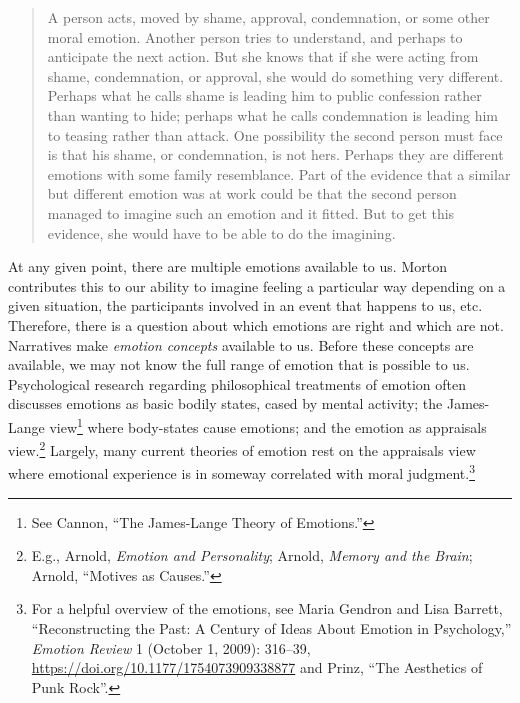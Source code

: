\documentclass[phdthesis,12pt,final,a4paper]{wuthesis}
\theoremstyle{definition}
\theoremstyle{definition}
\theoremstyle{definition}
\theoremstyle{definition}
\theoremstyle{remark}
\begin{document}
\begin{quote}
A person acts, moved by shame, approval, condemnation, or some other moral emotion. Another person tries to understand, and perhaps to anticipate the next action. But she knows that if she were acting from shame, condemnation, or approval, she would do something very different. Perhaps what he calls shame is leading him to public confession rather than wanting to hide; perhaps what he calls condemnation is leading him to teasing rather than attack. One possibility the second person must face is that his shame, or condemnation, is not hers. Perhaps they are different emotions with some family resemblance. Part of the evidence that a similar but different emotion was at work could be that the second person managed to imagine such an emotion and it fitted. But to get this evidence, she would have to be able to do the imagining.
\end{quote}

At any given point, there are multiple emotions available to us. Morton contributes this to our ability to imagine feeling a particular way depending on a given situation, the participants involved in an event that happens to us, etc. Therefore, there is a question about which emotions are right and which are not. Narratives make \emph{emotion concepts} available to us. Before these concepts are available, we may not know the full range of emotion that is possible to us. Psychological research regarding philosophical treatments of emotion often discusses emotions as basic bodily states, cased by mental activity; the James-Lange view\footnote{See Cannon, {``The {James-Lange} Theory of Emotions.''}} where body-states cause emotions; and the emotion as appraisals view.\footnote{E.g., Arnold, \emph{Emotion and {Personality}}; Arnold, \emph{Memory and the Brain}; Arnold, {``Motives as Causes.''}} Largely, many current theories of emotion rest on the appraisals view where emotional experience is in someway correlated with moral judgment.\footnote{For a helpful overview of the emotions, see Maria Gendron and Lisa Barrett, {``Reconstructing the {Past}: {A Century} of {Ideas About Emotion} in {Psychology},''} \emph{Emotion Review} 1 (October 1, 2009): 316--39, \url{https://doi.org/10.1177/1754073909338877} and Prinz, {``The {Aesthetics} of {Punk Rock}''}.}
\end{document}
